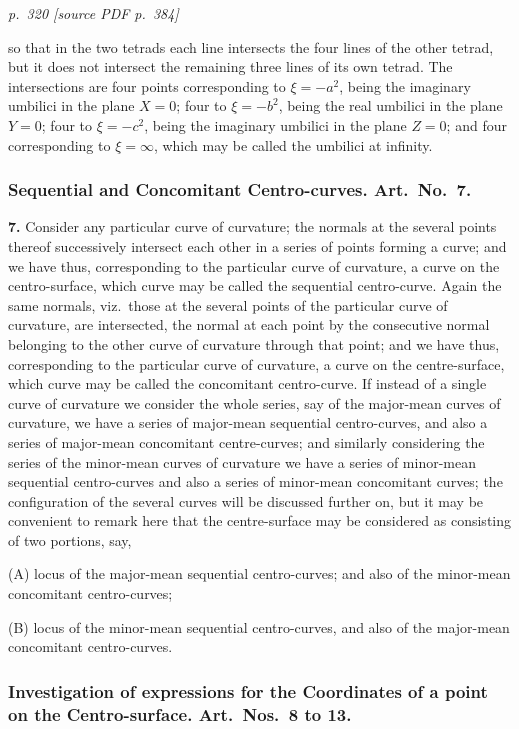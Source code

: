 \documentclass[11pt,a4paper]{article}
\newcommand{\pagemarker}[2]{\par\bigskip\noindent\textit{p.~#1 [source PDF p.~#2]}\par\smallskip}
\begin{document}
\clearpage

\pagemarker{320}{384}

so that in the two tetrads each line intersects the four lines of the other tetrad, but it does not intersect the remaining three lines of its own tetrad. The intersections are four points corresponding to $\xi=-a^2$, being the imaginary umbilici in the plane $X=0$; four to $\xi=-b^2$, being the real umbilici in the plane $Y=0$; four to $\xi=-c^2$, being the imaginary umbilici in the plane $Z=0$; and four corresponding to $\xi=\infty$, which may be called the umbilici at infinity.

\subsubsection*{Sequential and Concomitant Centro-curves. Art.\ No.\ 7.}

\textbf{7.} Consider any particular curve of curvature; the normals at the several points thereof successively intersect each other in a series of points forming a curve; and we have thus, corresponding to the particular curve of curvature, a curve on the centro-surface, which curve may be called the sequential centro-curve. Again the same normals, viz.\ those at the several points of the particular curve of curvature, are intersected, the normal at each point by the consecutive normal belonging to the other curve of curvature through that point; and we have thus, corresponding to the particular curve of curvature, a curve on the centre-surface, which curve may be called the concomitant centro-curve. If instead of a single curve of curvature we consider the whole series, say of the major-mean curves of curvature, we have a series of major-mean sequential centro-curves, and also a series of major-mean concomitant centre-curves; and similarly considering the series of the minor-mean curves of curvature we have a series of minor-mean sequential centro-curves and also a series of minor-mean concomitant curves; the configuration of the several curves will be discussed further on, but it may be convenient to remark here that the centre-surface may be considered as consisting of two portions, say,

(A) locus of the major-mean sequential centro-curves; and also of the minor-mean concomitant centro-curves;

(B) locus of the minor-mean sequential centro-curves, and also of the major-mean concomitant centro-curves.

\subsubsection*{Investigation of expressions for the Coordinates of a point on the Centro-surface. Art.\ Nos.\ 8 to 13.}
\end{document}
